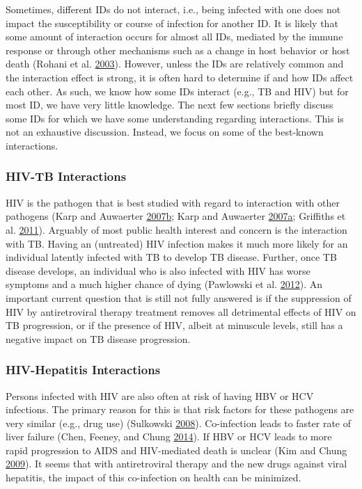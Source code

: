 \documentclass[]{article}
\theoremstyle{definition}
\theoremstyle{definition}
\theoremstyle{definition}
\theoremstyle{remark}
\begin{document}
Sometimes, different IDs do not interact, i.e., being infected with one
does not impact the susceptibility or course of infection for another
ID. It is likely that some amount of interaction occurs for almost all
IDs, mediated by the immune response or through other mechanisms such as
a change in host behavior or host death (Rohani et al.
\protect\hyperlink{ref-rohani03}{2003}). However, unless the IDs are
relatively common and the interaction effect is strong, it is often hard
to determine if and how IDs affect each other. As such, we know how some
IDs interact (e.g., TB and HIV) but for most ID, we have very little
knowledge. The next few sections briefly discuss some IDs for which we
have some understanding regarding interactions. This is not an
exhaustive discussion. Instead, we focus on some of the best-known
interactions.

\subsubsection{HIV-TB Interactions}\label{hiv-tb-interactions}

HIV is the pathogen that is best studied with regard to interaction with
other pathogens (Karp and Auwaerter
\protect\hyperlink{ref-karp07}{2007}\protect\hyperlink{ref-karp07}{b};
Karp and Auwaerter
\protect\hyperlink{ref-karp07a}{2007}\protect\hyperlink{ref-karp07a}{a};
Griffiths et al. \protect\hyperlink{ref-griffiths11}{2011}). Arguably of
most public health interest and concern is the interaction with TB.
Having an (untreated) HIV infection makes it much more likely for an
individual latently infected with TB to develop TB disease. Further,
once TB disease develops, an individual who is also infected with HIV
has worse symptoms and a much higher chance of dying (Pawlowski et al.
\protect\hyperlink{ref-pawlowski12}{2012}). An important current
question that is still not fully answered is if the suppression of HIV
by antiretroviral therapy treatment removes all detrimental effects of
HIV on TB progression, or if the presence of HIV, albeit at minuscule
levels, still has a negative impact on TB disease progression.

\subsubsection{HIV-Hepatitis
Interactions}\label{hiv-hepatitis-interactions}

Persons infected with HIV are also often at risk of having HBV or HCV
infections. The primary reason for this is that risk factors for these
pathogens are very similar (e.g., drug use) (Sulkowski
\protect\hyperlink{ref-sulkowski08}{2008}). Co-infection leads to faster
rate of liver failure (Chen, Feeney, and Chung
\protect\hyperlink{ref-chen14}{2014}). If HBV or HCV leads to more rapid
progression to AIDS and HIV-mediated death is unclear (Kim and Chung
\protect\hyperlink{ref-kim09}{2009}). It seems that with antiretroviral
therapy and the new drugs against viral hepatitis, the impact of this
co-infection on health can be minimized.
\end{document}
